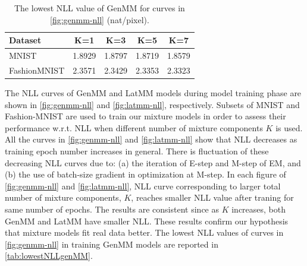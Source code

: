 \begin{table}
  \caption{The lowest NLL value of GenMM for curves in \autoref{fig:genmm-nll} (nat/pixel).}
  \label{tab:lowestNLLgenMM}
  \begin{tabular}{l|c|c|c|c}
    \toprule
    {Dataset} & K=1 &  K=3 &  K=5 &  K=7 \\                                         
    \midrule                                                                                          MNIST &     1.8929 &    1.8797 &    1.8719 &    1.8579 \\
    FashionMNIST &   2.3571 &   2.3429 &   2.3353 &   2.3323 \\ 
  \end{tabular} 
\end{table}
The NLL curves of GenMM and LatMM models during model training phase are shown in \autoref{fig:genmm-nll} and \autoref{fig:latmm-nll}, respectively. Subsets of MNIST and Fashion-MNIST are used to train our mixture models in order to assess their performance w.r.t. NLL when different number of mixture components $K$ is used. All the curves in \autoref{fig:genmm-nll} and \autoref{fig:latmm-nll} show that NLL decreases as training epoch number increases in general. There is fluctuation of these decreasing NLL curves due to: (a) the iteration of E-step and M-step of EM, and (b) the use of batch-size gradient in optimization at M-step. In each figure of \autoref{fig:genmm-nll} and \autoref{fig:latmm-nll}, NLL curve corresponding to larger total number of mixture components, $K$, reaches smaller NLL value after traning for same number of epochs. The results are consistent since as $K$ increases, both GenMM and LatMM have smaller NLL. These results confirm our hypothesis that mixture models fit real data better. The lowest NLL values of curves in \autoref{fig:genmm-nll} in training GenMM models are reported in \autoref{tab:lowestNLLgenMM}.


